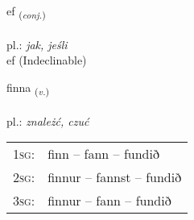 \documentclass[frontgrid, backgrid]{flacards}\usepackage[]{graphicx}\usepackage[]{xcolor}
\begin{document}
\renewcommand{\blhead}{\vskip5pt {\small\bfseries\footnotesize Samtenging | przysłówek }}
\renewcommand{\bcfoot}{\vskip5pt \hspace{2pt}{\small\bfseries\footnotesize 1K}}


{ef \small{\textsubscript{(\textit{conj.})}} \\[1ex]
\textphonetic{[ɛːf]} \\
pl.: \emph{jak, jeśli} \\  [2ex]
ef (Indeclinable)}

\renewcommand{\flhead}{\vskip5pt \fboxsep=0pt {\small\bfseries\footnotesize Sagnorð | czasownik}}
\renewcommand{\fcfoot}{\vskip5pt \fboxsep=0pt \hspace{2pt}{\small\bfseries\footnotesize 1K}}

\renewcommand{\blhead}{\vskip5pt {\small\bfseries\footnotesize Sagnorð | czasownik }}
\renewcommand{\bcfoot}{\vskip5pt \hspace{2pt}{\small\bfseries\footnotesize 1K}}


{finna \small{\textsubscript{(\textit{v.})}} \\[1ex] %
\textphonetic{[fɪna]} \\
pl.: \emph{znależć, czuć} \\  [2ex]
\renewcommand*{\arraystretch}{0.8}
\begin{tabular}{p{1cm}l}
\textsc{1sg}: & finn -- fann -- fundið \\ 
\textsc{2sg}: & finnur -- fannst -- fundið \\ 
\textsc{3sg}: & finnur -- fann -- fundið \\ 
\end{tabular}
}


\renewcommand{\flhead}{\vskip5pt \fboxsep=0pt {\small\bfseries\footnotesize Forsetning | przyimek}}
\renewcommand{\fcfoot}{\vskip5pt \fboxsep=0pt \hspace{2pt}{\small\bfseries\footnotesize 1K}}

\renewcommand{\blhead}{\vskip5pt {\small\bfseries\footnotesize Forsetning | przyimek }}
\renewcommand{\bcfoot}{\vskip5pt \hspace{2pt}{\small\bfseries\footnotesize 1K}}
\end{document}
